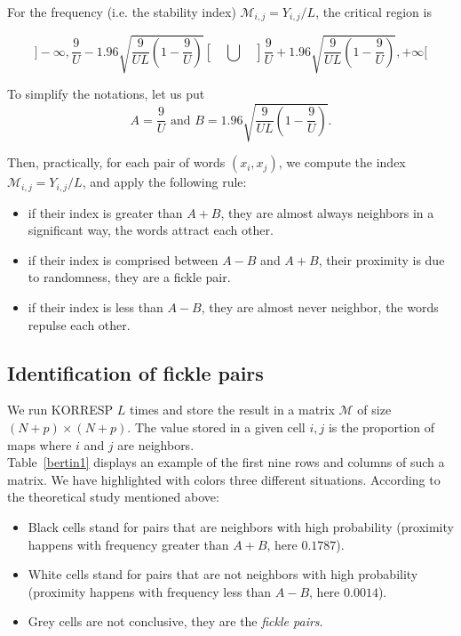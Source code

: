 \documentclass[preprint]{elsarticle}
\begin{document}
For the frequency (i.e. the stability index) $\mathcal{M}_{i,j} = Y_{i,j}/L$,  the critical region is 

\begin{equation} 
]-\infty,  \frac{9}{U} - 1.96 \sqrt{ \frac{9}{U L} ( 1 - \frac{9}{U})}[ 
\quad   \bigcup   \quad  ]  \frac{9}{U} + 1.96 \sqrt{  \frac{9}{U L} ( 1 - \frac{9}{U}) }, +\infty [ 
\end{equation}

To simplify the notations, let us put
\begin{equation}\label{AB}
 A = \frac{9}{U} \text{ and } B = 1.96 \sqrt{\frac{9}{UL} ( 1 - \frac{9}{U})}.
\end{equation}

Then, practically, for each pair of words $(x_i,x_j)$, we  compute the index $\mathcal{M}_{i,j} = Y_{i,j}/L$, and apply the following rule:\\ 
 
\begin{itemize}
\item if their index is greater than $A + B$, they are almost always neighbors in a significant way, the words attract each other.
\item if their index is comprised between $A - B$ and $A+B$, their proximity is due to randomness, they are a fickle pair.
\item if their index is less than $A - B$, they are almost never neighbor, the words repulse each other.
\end{itemize}

\subsection{Identification of fickle pairs}

We run KORRESP $L$ times and store the result in a matrix $\mathcal{M}$ of size $(N+p)\times(N+p)$. The value stored in a given cell $i,j$ is the proportion of maps where $i$ and $j$ are neighbors.\\

Table~\ref{bertin1} displays an example of the  first nine rows and columns of such a matrix. We have highlighted with colors three different situations. According to the theoretical study mentioned above:

\begin{itemize}
	\item Black cells stand for pairs that are neighbors with high probability (proximity happens with frequency greater than $A+B$, here $0.1787$).
	\item White cells stand for pairs that are not neighbors with high probability (proximity happens with frequency less than $A-B$, here $0.0014$).
	\item Grey cells are not conclusive, they are the \textit{fickle pairs}.
\end{itemize}
\end{document}
